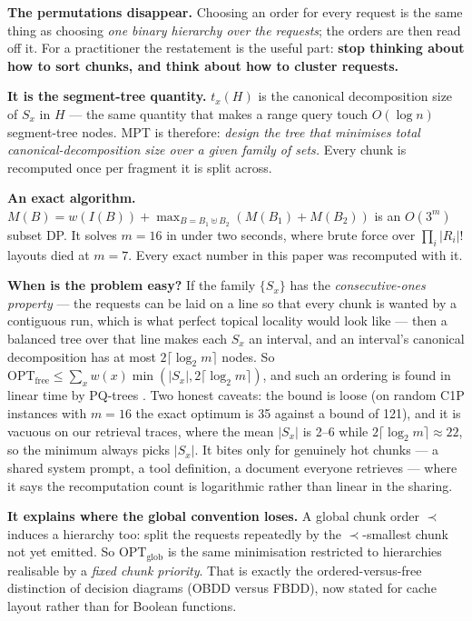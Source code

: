 \documentclass[11pt]{article}
\theoremstyle{plain}
\begin{document}
\textbf{The permutations disappear.} Choosing an order for every request is the same thing as choosing \emph{one binary hierarchy over the requests}; the orders are then read off it. For a practitioner the restatement is the useful part: \textbf{stop thinking about how to sort chunks, and think about how to cluster requests.}

\textbf{It is the segment-tree quantity.} $t_x(H)$ is the canonical decomposition size of $S_x$ in $H$ --- the same quantity that makes a range query touch $O(\log n)$ segment-tree nodes. MPT is therefore: \emph{design the tree that minimises total canonical-decomposition size over a given family of sets.} Every chunk is recomputed once per fragment it is split across.

\textbf{An exact algorithm.} $M(B) = w(I(B)) + \max_{B = B_1 \uplus B_2}(M(B_1)+M(B_2))$ is an $O(3^m)$ subset DP. It solves $m = 16$ in under two seconds, where brute force over $\prod_i |R_i|!$ layouts died at $m = 7$. Every exact number in this paper was recomputed with it.

\textbf{When is the problem easy?} If the family $\{S_x\}$ has the \emph{consecutive-ones property} --- the requests can be laid on a line so that every chunk is wanted by a contiguous run, which is what perfect topical locality would look like --- then a balanced tree over that line makes each $S_x$ an interval, and an interval's canonical decomposition has at most $2\lceil\log_2 m\rceil$ nodes. So $\mathrm{OPT}_{\mathrm{free}} \le \sum_x w(x)\min(|S_x|, 2\lceil\log_2 m\rceil)$, and such an ordering is found in linear time by PQ-trees \cite{BL76}. Two honest caveats: the bound is loose (on random C1P instances with $m=16$ the exact optimum is 35 against a bound of 121), and it is vacuous on our retrieval traces, where the mean $|S_x|$ is 2--6 while $2\lceil\log_2 m\rceil \approx 22$, so the minimum always picks $|S_x|$. It bites only for genuinely hot chunks --- a shared system prompt, a tool definition, a document everyone retrieves --- where it says the recomputation count is logarithmic rather than linear in the sharing.

\textbf{It explains where the global convention loses.} A global chunk order $\prec$ induces a hierarchy too: split the requests repeatedly by the $\prec$-smallest chunk not yet emitted. So $\mathrm{OPT}_{\mathrm{glob}}$ is the same minimisation restricted to hierarchies realisable by a \emph{fixed chunk priority}. That is exactly the ordered-versus-free distinction of decision diagrams (OBDD versus FBDD), now stated for cache layout rather than for Boolean functions.
\end{document}
